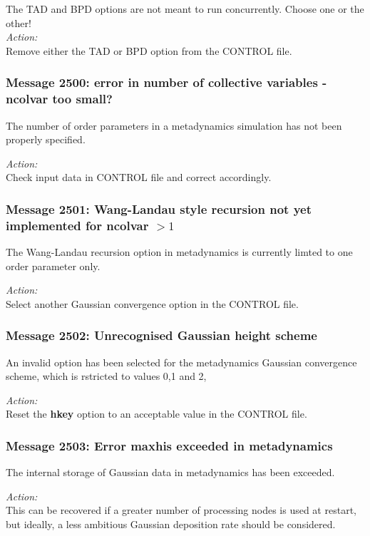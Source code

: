 The TAD and BPD options are not meant to run concurrently. Choose one or the
other! \\

\noindent
{\em Action:}\\ Remove either the TAD or BPD option from the CONTROL file.

\subsubsection*{Message 2500: error in number of collective variables -
ncolvar too small?}

The number of order parameters in a metadynamics simulation  has not been
properly specified.

\noindent
{\em Action:}\\ Check input data in CONTROL file and correct accordingly.

\subsubsection*{Message 2501: Wang-Landau style recursion not yet 
implemented for ncolvar $> 1$}

The Wang-Landau recursion option in metadynamics is currently limted to one
order parameter only.

\noindent
{\em Action:}\\ Select another Gaussian convergence option in the CONTROL file.

\subsubsection*{Message 2502: Unrecognised Gaussian height scheme}

An invalid option has been selected for the metadynamics Gaussian convergence
scheme, which is rstricted to values 0,1 and 2,

\noindent
{\em Action:}\\ Reset the {\bf hkey} option to an acceptable value in the CONTROL
file. 
      
\subsubsection*{Message 2503: Error maxhis exceeded in metadynamics}

The internal storage of Gaussian data in metadynamics has been exceeded.

\noindent
{\em Action:}\\ This can be recovered if a greater number of processing nodes
is used at restart, but ideally, a less ambitious Gaussian deposition rate
should be considered.

